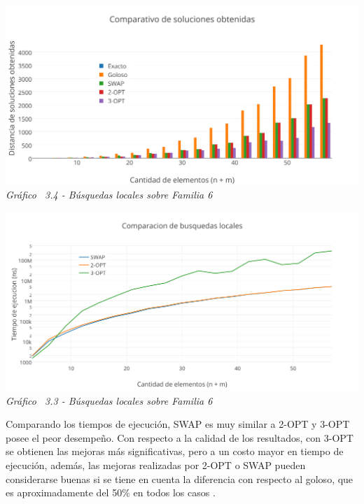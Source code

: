 \vspace*{0.3cm} \vspace*{0.3cm}
  \begin{center}
 \includegraphics[scale=0.5]{./EJ3/comparacionbusquedaslocalessolucionsinorden.png}\\
 {            \textit{Gráfico \ 3.4 - Búsquedas locales sobre Familia 6}}
  \end{center}
  \vspace*{0.3cm}


\vspace*{0.3cm} \vspace*{0.3cm}
  \begin{center}
 \includegraphics[scale=0.5]{./EJ3/comparacionbusquedaslocalessinorden.png}\\
 {            \textit{Gráfico \ 3.3 - Búsquedas locales sobre Familia 6}}
  \end{center}
  \vspace*{0.3cm}

Comparando los tiempos de ejecución, SWAP es muy similar a 2-OPT y 3-OPT  posee el peor desempeño. Con respecto a la calidad de los resultados, con 3-OPT se obtienen las mejoras más significativas, pero a un costo mayor en tiempo de ejecución, además, las mejoras realizadas por 2-OPT o SWAP pueden considerarse buenas si se tiene en cuenta la diferencia con respecto al goloso, que es aproximadamente del 50$\%$ en todos los casos .\\

